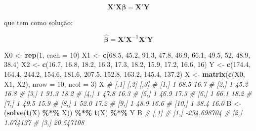 \documentclass[
]{book}
\newenvironment{Shaded}{\begin{snugshade}}{\end{snugshade}}
\newcommand{\CommentTok}[1]{\textcolor[rgb]{0.56,0.35,0.01}{\textit{#1}}}
\newcommand{\DataTypeTok}[1]{\textcolor[rgb]{0.13,0.29,0.53}{#1}}
\newcommand{\DecValTok}[1]{\textcolor[rgb]{0.00,0.00,0.81}{#1}}
\newcommand{\FloatTok}[1]{\textcolor[rgb]{0.00,0.00,0.81}{#1}}
\newcommand{\KeywordTok}[1]{\textcolor[rgb]{0.13,0.29,0.53}{\textbf{#1}}}
\newcommand{\NormalTok}[1]{#1}
\newcommand{\OperatorTok}[1]{\textcolor[rgb]{0.81,0.36,0.00}{\textbf{#1}}}
\newcommand{\StringTok}[1]{\textcolor[rgb]{0.31,0.60,0.02}{#1}}
\numberwithin{equation}{section}
\begin{document}
\[
\boldsymbol{X'X{\beta = X'Y}}
\]

que tem como solução:

\[
\boldsymbol{\hat\beta = X'X^{-1}X'Y}
\]

\begin{Shaded}
\begin{Highlighting}[]
\NormalTok{X0 \textless{}{-}}\StringTok{ }\KeywordTok{rep}\NormalTok{(}\DecValTok{1}\NormalTok{, }\DataTypeTok{each =} \DecValTok{10}\NormalTok{)}
\NormalTok{X1 \textless{}{-}}\StringTok{ }\KeywordTok{c}\NormalTok{(}\FloatTok{68.5}\NormalTok{, }\FloatTok{45.2}\NormalTok{, }\FloatTok{91.3}\NormalTok{, }\FloatTok{47.8}\NormalTok{, }\FloatTok{46.9}\NormalTok{, }\FloatTok{66.1}\NormalTok{, }\FloatTok{49.5}\NormalTok{, }\DecValTok{52}\NormalTok{, }\FloatTok{48.9}\NormalTok{, }\FloatTok{38.4}\NormalTok{)}
\NormalTok{X2 \textless{}{-}}\StringTok{ }\KeywordTok{c}\NormalTok{(}\FloatTok{16.7}\NormalTok{, }\FloatTok{16.8}\NormalTok{, }\FloatTok{18.2}\NormalTok{, }\FloatTok{16.3}\NormalTok{, }\FloatTok{17.3}\NormalTok{, }\FloatTok{18.2}\NormalTok{, }\FloatTok{15.9}\NormalTok{, }\FloatTok{17.2}\NormalTok{, }\FloatTok{16.6}\NormalTok{, }\DecValTok{16}\NormalTok{)}
\NormalTok{Y \textless{}{-}}\StringTok{ }\KeywordTok{c}\NormalTok{(}\FloatTok{174.4}\NormalTok{,  }\FloatTok{164.4}\NormalTok{, }\FloatTok{244.2}\NormalTok{, }\FloatTok{154.6}\NormalTok{, }\FloatTok{181.6}\NormalTok{, }\FloatTok{207.5}\NormalTok{, }\FloatTok{152.8}\NormalTok{, }\FloatTok{163.2}\NormalTok{, }\FloatTok{145.4}\NormalTok{, }\FloatTok{137.2}\NormalTok{)}
\NormalTok{X \textless{}{-}}\StringTok{ }\KeywordTok{matrix}\NormalTok{(}\KeywordTok{c}\NormalTok{(X0, X1, X2), }\DataTypeTok{nrow =} \DecValTok{10}\NormalTok{, }\DataTypeTok{ncol =} \DecValTok{3}\NormalTok{)}
\NormalTok{X}
\CommentTok{\#       [,1] [,2] [,3]}
\CommentTok{\#  [1,]    1 68.5 16.7}
\CommentTok{\#  [2,]    1 45.2 16.8}
\CommentTok{\#  [3,]    1 91.3 18.2}
\CommentTok{\#  [4,]    1 47.8 16.3}
\CommentTok{\#  [5,]    1 46.9 17.3}
\CommentTok{\#  [6,]    1 66.1 18.2}
\CommentTok{\#  [7,]    1 49.5 15.9}
\CommentTok{\#  [8,]    1 52.0 17.2}
\CommentTok{\#  [9,]    1 48.9 16.6}
\CommentTok{\# [10,]    1 38.4 16.0}
\NormalTok{B \textless{}{-}}\StringTok{ }\NormalTok{(}\KeywordTok{solve}\NormalTok{(}\KeywordTok{t}\NormalTok{(X) }\OperatorTok{\%*\%}\StringTok{ }\NormalTok{X)) }\OperatorTok{\%*\%}\StringTok{  }\KeywordTok{t}\NormalTok{(X) }\OperatorTok{\%*\%}\StringTok{ }\NormalTok{Y}
\NormalTok{B}
\CommentTok{\#             [,1]}
\CommentTok{\# [1,] {-}234.698704}
\CommentTok{\# [2,]    1.074137}
\CommentTok{\# [3,]   20.547108}
\end{Highlighting}
\end{Shaded}
\end{document}
